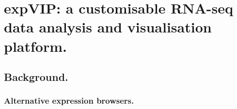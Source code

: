 
\chapter[expVIP]{expVIP: a customisable RNA-seq data analysis and visualisation platform.}
\label{cha:exp}


\section{Background.}









\subsection{Alternative expression browsers.}
\label{exp:alternative}

